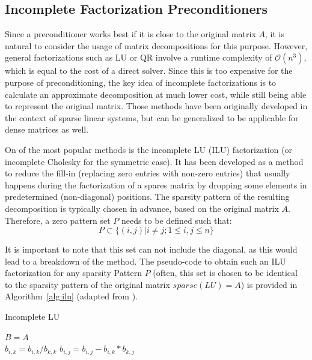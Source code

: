 \subsection{Incomplete Factorization Preconditioners}
\label{sec:incomplete_preconditioners}

Since a preconditioner works best if it is close to the original matrix $A$, it is natural to consider the usage of matrix decompositions for this purpose. However, general factorizations such as LU or QR involve a runtime complexity of $\mathcal{O}(n^3)$, which is equal to the cost of a direct solver. Since this is too expensive for the purpose of preconditioning, the key idea of incomplete factorizations is to calculate an approximate decomposition at much lower cost, while still being able to represent the original matrix. Those methods have been originally developed in the context of sparse linear systems, but can be generalized to be applicable for dense matrices as well.

On of the most popular methods is the incomplete LU (ILU) factorization (or incomplete Cholesky for the symmetric case). It has been developed as a method to reduce the fill-in (replacing zero entries with non-zero entries) that usually happens during the factorization of a spares matrix by dropping some elements in predetermined (non-diagonal) positions. The sparsity pattern of the resulting decomposition is typically chosen in advance, based on the original matrix $A$. Therefore, a zero pattern set $P$ needs to be defined such that:
\begin{equation}
    P \subset \{(i,j)|i \neq j; 1 \leq i,j\leq n\}
\end{equation}

\noindent It is important to note that this set can not include the diagonal, as this would lead to a breakdown of the method. The pseudo-code to obtain such an ILU factorization for any sparsity Pattern $P$ (often, this set is chosen to be identical to the sparsity pattern of the original matrix $sparse(LU)=A$) is provided in Algorithm~\hyperref[alg:ilu]{\ref{alg:ilu}} (adapted from \cite{saad_iterative_2003}). 

\begin{algorithm}[h]
  \caption{Incomplete LU}
  \label{alg:ilu}
  \SetAlgoLined
  $B=A$ \\
   {
     {
      {$b_{i,k}=b_{i,k}/b_{k,k}$}
       {
        {$b_{i,j}=b_{i,j}-b_{i,k}*b_{k,j}$}
      }
    }
  }
\end{algorithm}


